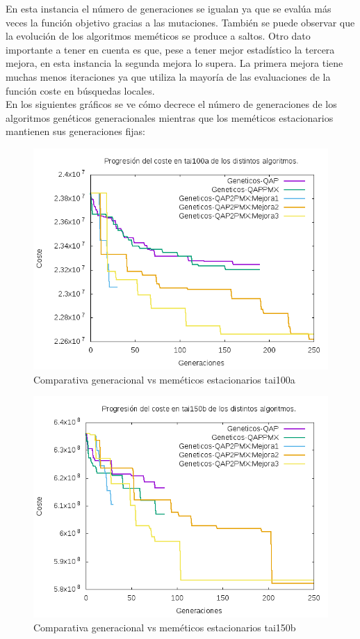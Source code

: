 En esta instancia el número de generaciones se igualan ya que se evalúa más veces la función objetivo gracias a las mutaciones. También se puede observar que la evolución de los algoritmos meméticos se produce a saltos. Otro dato importante a tener en cuenta es que, pese a tener mejor estadístico la tercera mejora,  en esta instancia la segunda mejora lo supera. La primera mejora tiene muchas menos iteraciones ya que utiliza la mayoría de las evaluaciones de la función coste en búsquedas locales.\\

En los siguientes gráficos se ve cómo decrece el número de generaciones de los algoritmos genéticos generacionales mientras que los meméticos estacionarios mantienen sus generaciones fijas:\\

\begin{figure}[H]
	\centering
	\includegraphics[width=0.7\linewidth]{graficos/comparativaGeneracionaltai100a}
	\caption{Comparativa generacional vs meméticos estacionarios tai100a}
	\label{fig:comparativaGeneracionaltai100a}
\end{figure}
 
\begin{figure}[H]
\centering
\includegraphics[width=0.7\linewidth]{graficos/comparativaGeneracionaltai150b}
\caption{Comparativa generacional vs meméticos estacionarios tai150b}
\label{fig:comparativaGeneracionaltai150b}
\end{figure}

